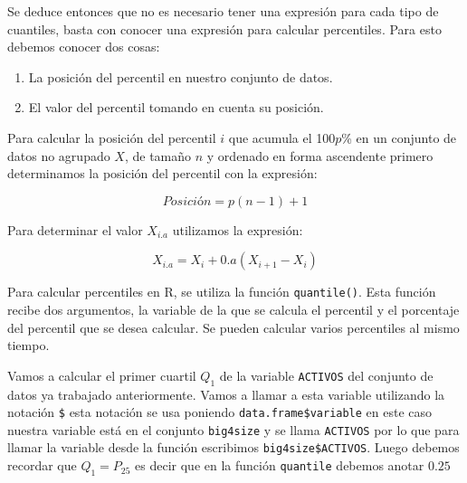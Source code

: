 \documentclass[]{book}
\newenvironment{Shaded}{\begin{snugshade}}{\end{snugshade}}
\newcommand{\FloatTok}[1]{\textcolor[rgb]{0.00,0.00,0.81}{#1}}
\newcommand{\KeywordTok}[1]{\textcolor[rgb]{0.13,0.29,0.53}{\textbf{#1}}}
\newcommand{\NormalTok}[1]{#1}
\newcommand{\OperatorTok}[1]{\textcolor[rgb]{0.81,0.36,0.00}{\textbf{#1}}}
\providecommand{\tightlist}{%
  \setlength{\itemsep}{0pt}\setlength{\parskip}{0pt}}
\begin{document}
Se deduce entonces que no es necesario tener una expresión para cada tipo de cuantiles, basta con conocer una expresión para calcular percentiles. Para esto debemos conocer dos cosas:

\begin{enumerate}
\def\labelenumi{\arabic{enumi}.}
\tightlist
\item
  La posición del percentil en nuestro conjunto de datos.
\item
  El valor del percentil tomando en cuenta su posición.
\end{enumerate}

Para calcular la posición del percentil \(i\) que acumula el 100\(p\)\% en un conjunto de datos no agrupado \(X\), de tamaño \(n\) y ordenado en forma ascendente primero determinamos la posición del percentil con la expresión:

\begin{equation} 
  Posición = p(n-1)+1
  \label{eq:posperc}
\end{equation}

Para determinar el valor \(X_{i.a}\) utilizamos la expresión:

\begin{equation} 
  X_{i.a}=X_{i}+0.a(X_{i+1}-X_{i})
  \label{eq:valperc}
\end{equation}

Para calcular percentiles en R, se utiliza la función \texttt{quantile()}. Esta función recibe dos argumentos, la variable de la que se calcula el percentil y el porcentaje del percentil que se desea calcular. Se pueden calcular varios percentiles al mismo tiempo.

Vamos a calcular el primer cuartil \(Q_{1}\) de la variable \texttt{ACTIVOS} del conjunto de datos ya trabajado anteriormente. Vamos a llamar a esta variable utilizando la notación \texttt{\$} esta notación se usa poniendo \texttt{data.frame\$variable} en este caso nuestra variable está en el conjunto \texttt{big4size} y se llama \texttt{ACTIVOS} por lo que para llamar la variable desde la función escribimos \texttt{big4size\$ACTIVOS}. Luego debemos recordar que \(Q_1=P_{25}\) es decir que en la función \texttt{quantile} debemos anotar \(0.25\)

\begin{Shaded}
\end{Shaded}
\end{document}
